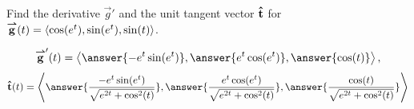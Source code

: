 \documentclass{ximera}
\author{David Guichard \and Neal Koblitz \and H. Jerome Keisler \and Albert Scheller \and Barry Balof \and Mike Wills \and Matthew Carr}
\begin{document}
\begin{exercise}
Find the derivative $\vec{g}'$ and the unit tangent vector $\mathbf{\hat{t}}$
for ${\overset{\boldsymbol{\rightharpoonup}}{\mathbf{g}}}(t)=\left\langle \cos(e^t),\sin(e^t),\sin(t)\right\rangle$.

\begin{prompt}
\[
\vec{g}'(t)=\vector{\answer{-e^{t}\sin(e^t)},\answer{e^{t}\cos(e^t)},\answer{\cos(t)}},
\]
\[
\utan(t)=\vector{\answer{\frac{-e^{t}\sin(e^{t})}{\sqrt{e^{2t}+\cos^{2}(t)}}},\answer{\frac{e^{t}\cos(e^{t})}{\sqrt{e^{2t}+\cos^{2}(t)}}},\answer{\frac{\cos(t)}{\sqrt{e^{2t}+\cos^{2}(t)}}}}
\]
\end{prompt}


\end{exercise}
\end{document}
